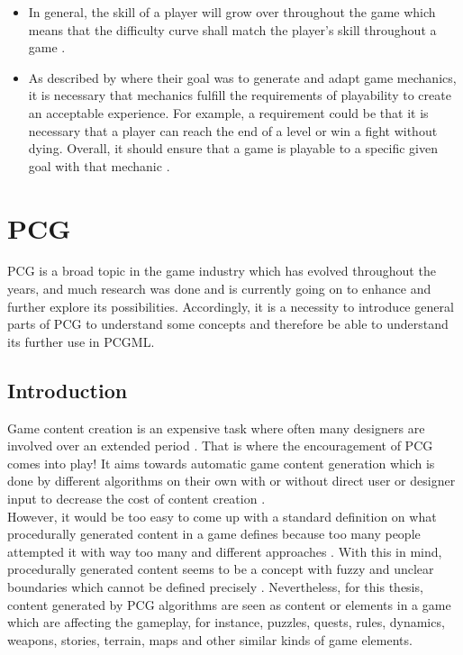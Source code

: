 \documentclass[MGS,Master,english]{twbook}%
\begin{document}
\begin{itemize}
	\item In general, the skill of a player will grow over throughout the game which means that the difficulty curve shall match the player's skill throughout a game \cite{mechanic::gamasutra::DanielDoan}. 
	\item As described by \citep{mechanic::generateAndAdaptingMechanics} where their goal was to generate and adapt game mechanics, it is necessary that mechanics fulfill the requirements of playability to create an acceptable experience. For example, a requirement could be that it is necessary that a player can reach the end of a level or win a fight without dying. Overall, it should ensure that a game is playable to a specific given goal with that mechanic \cite{mechanic::generateAndAdaptingMechanics}.
\end{itemize} 


%
%
\clearpage
\chapter{\acl{PCG}}
\ac{PCG} is a broad topic in the game industry which has evolved throughout the years, and much research was done and is currently going on to enhance and further explore its possibilities. Accordingly, it is a necessity to introduce general parts of PCG to understand some concepts and therefore be able to understand its further use in PCGML.

\section{Introduction}
Game content creation is an expensive task where often many designers are involved over an extended period \cite{pcg::PCGinGameIndustry}. That is where the encouragement of \ac{PCG} comes into play! It aims towards automatic game content generation which is done by different algorithms on their own with or without direct user or designer input to decrease the cost of content creation \cite{pcg::PCGinGameIndustry} \cite{pcg::whatIsPCG}.\\
However, it would be too easy to come up with a standard definition on what procedurally generated content in a game defines because too many people attempted it with way too many and different approaches \cite{pcg::whatIsPCG}. With this in mind, procedurally generated content seems to be a concept with fuzzy and unclear boundaries which cannot be defined precisely \cite{pcg::whatIsPCG}. Nevertheless, for this thesis, content generated by PCG algorithms are seen as content or elements in a game which are affecting the gameplay, for instance, puzzles, quests, rules, dynamics, weapons, stories, terrain, maps and other similar kinds of game elements.
\end{document}
